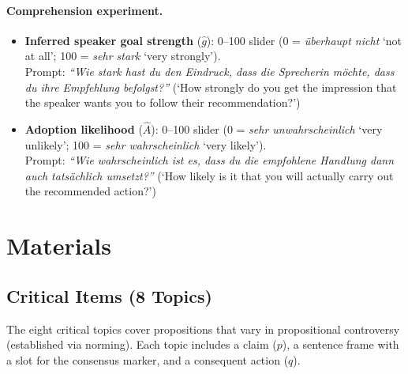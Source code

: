 \documentclass[12pt]{article}
\begin{document}
\paragraph{Comprehension experiment.}
\begin{itemize}
    \item \textbf{Inferred speaker goal strength} ($\hat{g}$): 0--100 slider (0 = \textit{\"uberhaupt nicht} `not at all'; 100 = \textit{sehr stark} `very strongly').\\
    Prompt: \textit{``Wie stark hast du den Eindruck, dass die Sprecherin m\"ochte, dass du ihre Empfehlung befolgst?''} (`How strongly do you get the impression that the speaker wants you to follow their recommendation?')
    \item \textbf{Adoption likelihood} ($\hat{A}$): 0--100 slider (0 = \textit{sehr unwahrscheinlich} `very unlikely'; 100 = \textit{sehr wahrscheinlich} `very likely').\\
    Prompt: \textit{``Wie wahrscheinlich ist es, dass du die empfohlene Handlung dann auch tats\"achlich umsetzt?''} (`How likely is it that you will actually carry out the recommended action?')
\end{itemize}


\section{Materials}

\subsection{Critical Items (8 Topics)}

The eight critical topics cover propositions that vary in propositional controversy (established via norming). Each topic includes a claim ($p$), a sentence frame with a slot for the consensus marker, and a consequent action ($q$).
\end{document}
